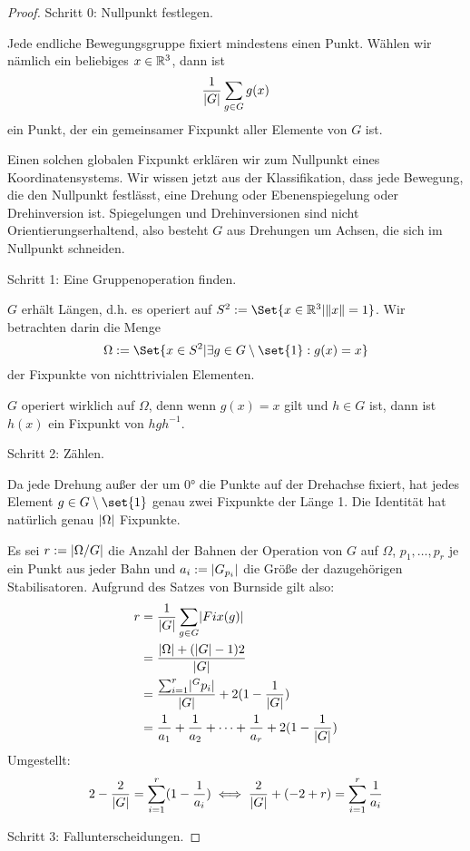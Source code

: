\begin{proof}
Schritt 0: Nullpunkt festlegen.

Jede endliche Bewegungsgruppe fixiert mindestens einen Punkt. Wählen wir nämlich ein beliebiges $x\in\mathbb{R}^3$, dann ist
\[\frac{1}{\lvert G\rvert}\sum_{g\in G} g(x)\]
ein Punkt, der ein gemeinsamer Fixpunkt aller Elemente von $G$ ist.

Einen solchen globalen Fixpunkt erklären wir zum Nullpunkt eines Koordinatensystems. Wir wissen jetzt aus der Klassifikation, dass jede Bewegung, die den Nullpunkt festlässt, eine Drehung oder Ebenenspiegelung oder Drehinversion ist. Spiegelungen und Drehinversionen sind nicht Orientierungserhaltend, also besteht $G$ aus Drehungen um Achsen, die sich im Nullpunkt schneiden.

\medbreak
Schritt 1: Eine Gruppenoperation finden.

$G$ erhält Längen, d.h. es operiert auf $S^2:=\Set{x\in\IR^3 | \norm{x}=1}$. Wir betrachten darin die Menge
\[\Omega:=\Set{x\in S^2 | \exists g\in G\setminus\set{1}: g(x)=x}\]
der Fixpunkte von nichttrivialen Elementen.

$G$ operiert wirklich auf $\Omega$, denn wenn $g(x)=x$ gilt und $h\in G$ ist, dann ist $h(x)$ ein Fixpunkt von $hgh^{-1}$.

\medbreak
Schritt 2: Zählen.

Da jede Drehung außer der um 0° die Punkte auf der Drehachse fixiert, hat jedes Element $g\in G\setminus\set{1}$ genau zwei Fixpunkte der Länge 1. Die Identität hat natürlich genau $\lvert\Omega\rvert$ Fixpunkte.

Es sei $r:=\lvert\Omega/G\rvert$ die Anzahl der Bahnen der Operation von $G$ auf $\Omega$, $p_1,\ldots,p_r$ je ein Punkt aus jeder Bahn und $a_i:=\lvert G_{p_i}\rvert$ die Größe der dazugehörigen Stabilisatoren. Aufgrund des Satzes von Burnside gilt also:
\begin{align*}
r &= \frac{1}{\lvert G\rvert}\sum_{g\in G} \lvert Fix(g)\rvert \\
&=\frac{\lvert\Omega\rvert + (\lvert G\rvert-1)2}{\lvert G\rvert} \\
&=\frac{\sum_{i=1}^r \lvert^G p_i\rvert}{\lvert G\rvert} + 2(1-\frac{1}{\lvert G\rvert}) \\
&=\frac{1}{a_1}+\frac{1}{a_2}+\cdots+\frac{1}{a_r}+2(1-\frac{1}{\lvert G\rvert})
\end{align*}
Umgestellt:
\[2-\frac{2}{\lvert G\rvert} = \sum_{i=1}^r(1-\frac{1}{a_i}) \iff \frac{2}{\lvert G\rvert}+(-2+r) =  \sum_{i=1}^r \frac{1}{a_i} \]

\medbreak
Schritt 3: Fallunterscheidungen.


\end{proof}
